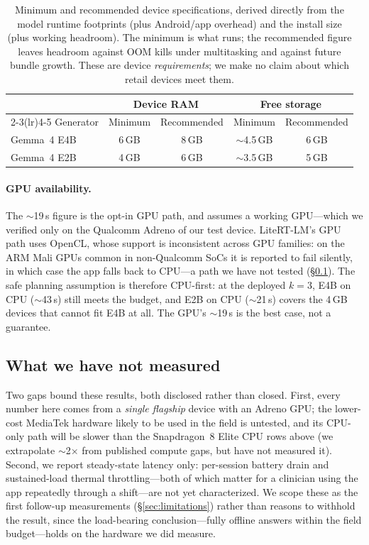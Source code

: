 \begin{table}[t]
\caption{Minimum and recommended device specifications, derived directly from
the model runtime footprints (plus Android/app overhead) and the install size
(plus working headroom). The minimum is what runs; the recommended figure
leaves headroom against OOM kills under multitasking and against future bundle
growth. These are device \emph{requirements}; we make no claim about which
retail devices meet them.}
\label{tab:devices}
\centering
\small
\setlength{\tabcolsep}{6pt}
\begin{tabular}{@{}lcccc@{}}
\toprule
 & \multicolumn{2}{c}{Device RAM} & \multicolumn{2}{c}{Free storage} \\
\cmidrule(lr){2-3}\cmidrule(lr){4-5}
Generator & Minimum & Recommended & Minimum & Recommended \\
\midrule
Gemma~4 E4B & 6\,GB & 8\,GB & $\sim$4.5\,GB & 6\,GB \\
Gemma~4 E2B & 4\,GB & 6\,GB & $\sim$3.5\,GB & 5\,GB \\
\bottomrule
\end{tabular}
\end{table}

\paragraph{GPU availability.} The $\sim$19\,s figure is the opt-in GPU path, and
assumes a working GPU---which we verified only on the Qualcomm Adreno of our
test device.
LiteRT-LM's GPU path uses OpenCL, whose support is inconsistent across GPU
families: on the ARM Mali GPUs common in non-Qualcomm SoCs it is reported to
fail silently, in which case the app falls back to CPU---a path we have not
tested (\S\ref{sec:latency-pending}). The safe planning assumption is therefore
CPU-first: at the deployed $k=3$, E4B on CPU ($\sim$43\,s) still meets the
budget, and E2B on CPU ($\sim$21\,s) covers the 4\,GB devices that cannot fit
E4B at all. The GPU's $\sim$19\,s is the best case, not a guarantee.

\subsection{What we have not measured}
\label{sec:latency-pending}

Two gaps bound these results, both disclosed rather than closed. First, every
number here comes from a \emph{single flagship} device with an Adreno GPU; the
lower-cost MediaTek hardware likely to be used in the field is untested, and its
CPU-only path will be slower than the Snapdragon~8 Elite CPU
rows above (we extrapolate $\sim$2$\times$ from published compute gaps, but have
not measured it). Second, we report steady-state latency only: per-session
battery drain and sustained-load thermal throttling---both of which matter for a
clinician using the app repeatedly through a shift---are not yet characterized.
We scope these as the first follow-up measurements (\S\ref{sec:limitations})
rather than reasons to withhold the result, since the load-bearing
conclusion---fully offline answers within the field budget---holds on the
hardware we did measure.
